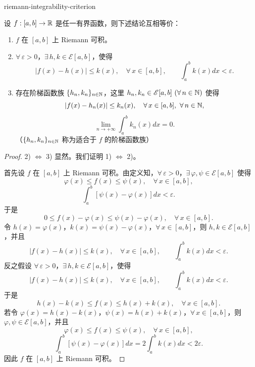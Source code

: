 \begin{mythm}{}{riemann-integrability-criterion}

	设 \(f:[a,b]\to\mathbb{R}\) 是任一有界函数，则下述结论互相等价：

	\begin{enumerate}[label=\arabic*)]
		\item \(f\) 在 \([a,b]\) 上 Riemann 可积。

		\item \(\forall\,\varepsilon>0\)，\(\exists\,h,k\in\mathscr{E}[a,b]\)，使得
		\[
		|f(x)-h(x)|\le k(x),\quad\forall\,x\in[a,b],\qquad\int_a^b k(x)dx<\varepsilon.
		\]

		\item 存在阶梯函数族 \(\{h_n,k_n\}_{n\in\mathbb{N}}\)，这里 \(h_n,k_n\in\mathscr{E}[a,b]\ (\forall\,n\in\N)\) 使得
		\[
		|f(x)-h_n(x)|\le k_n(x),\quad\forall\,x\in[a,b],\ \forall\,n\in\N,
		\]
		\[
		\lim_{n\to+\infty}\int_a^b k_n(x)dx=0.
		\]
		（\(\{h_n,k_n\}_{n\in\mathbb{N}}\) 称为适合于 \(f\) 的阶梯函数族）
	\end{enumerate}

\end{mythm}

\begin{proof}

	2) \(\Longleftrightarrow\) 3) 显然。我们证明 1) \(\Longleftrightarrow\) 2)。

	首先设 \(f\) 在 \([a,b]\) 上 Riemann 可积。由定义知，\(\forall\,\varepsilon>0\)，\(\exists\,\varphi,\psi\in\mathscr{E}[a,b]\) 使得
	\[
	\varphi(x)\le f(x)\le\psi(x),\quad\forall\,x\in[a,b],
	\]
	\[
	\int_a^b[\psi(x)-\varphi(x)]dx<\varepsilon.
	\]
	于是
	\[
	0\le f(x)-\varphi(x)\le\psi(x)-\varphi(x),\quad\forall\,x\in[a,b].
	\]
	令 \(h(x)=\varphi(x)\)，\(k(x)=\psi(x)-\varphi(x)\)，\(\forall\,x\in[a,b]\)，则 \(h,k\in\mathscr{E}[a,b]\)，并且
	\[
	|f(x)-h(x)|\le k(x),\quad\forall\,x\in[a,b],\qquad\int_a^b k(x)dx<\varepsilon.
	\]
	反之假设 \(\forall\,\varepsilon>0\)，\(\exists\,h,k\in\mathscr{E}[a,b]\)，使得
	\[
	|f(x)-h(x)|\le k(x),\quad\forall\,x\in[a,b],\qquad\int_a^b k(x)dx<\varepsilon.
	\]
	于是
	\[
	h(x)-k(x)\le f(x)\le h(x)+k(x),\quad\forall\,x\in[a,b].
	\]
	若令 \(\varphi(x)=h(x)-k(x)\)，\(\psi(x)=h(x)+k(x)\)，\(\forall\,x\in[a,b]\)，则 \(\varphi,\psi\in\mathscr{E}[a,b]\)，并且
	\[
	\varphi(x)\le f(x)\le\psi(x),\quad\forall\,x\in[a,b],
	\]
	\[
	\int_a^b[\psi(x)-\varphi(x)]dx=2\int_a^b k(x)dx<2\varepsilon.
	\]
	因此 \(f\) 在 \([a,b]\) 上 Riemann 可积。

\end{proof}

